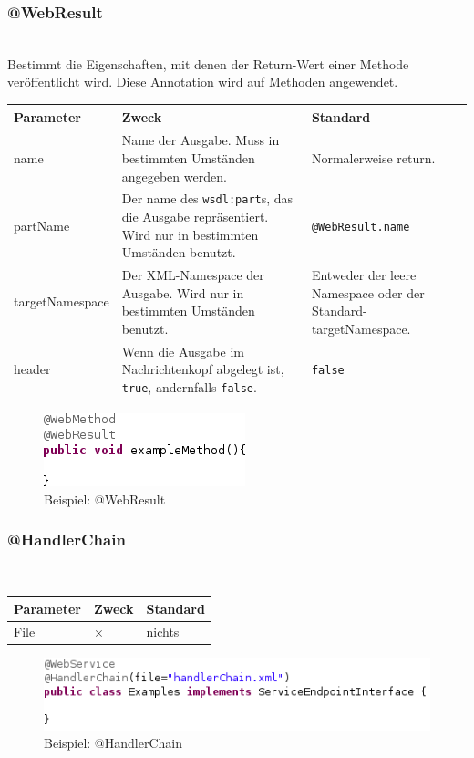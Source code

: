 \documentclass[runningheads]{llncs}
\newcommand{\germanquote}[1]{\glqq{}#1\grqq{}}
\newcommand{\anntabwidth}{\textwidth}
\begin{document}
    \subsubsection{@WebResult}\ \\
      Bestimmt die Eigenschaften, mit denen der Return-Wert einer Methode veröffentlicht wird. Diese Annotation wird auf Methoden angewendet.\\
    \begin{tabulary}{\anntabwidth}{|l|L|L|}
    \hline
    \textbf{Parameter} & \textbf{Zweck} & \textbf{Standard} \\
    \hline
      name &
      Name der Ausgabe. Muss in bestimmten Umständen angegeben werden. &
      Normalerweise \germanquote{return}. \\
    \hline
      partName &
      Der name des \texttt{wsdl:part}s, das die Ausgabe repräsentiert. Wird nur in bestimmten Umständen benutzt. &
      \texttt{@WebResult.name} \\
    \hline
      targetNamespace &
      Der XML-Namespace der Ausgabe. Wird nur in bestimmten Umständen benutzt. &
      Entweder der leere Namespace oder der Standard-targetNamespace. \\
    \hline
      header &
      Wenn die Ausgabe im Nachrichtenkopf abgelegt ist, \texttt{true}, andernfalls \texttt{false}. &
      \texttt{false} \\
    \hline
    \end{tabulary} \vfill
    \begin{figure}[tbh]
      \centering
      \includegraphics{../images/AtWebResult.png}
      \caption{Beispiel: @WebResult}
      \label{fig:wr}
    \end{figure} \vfill

    \subsubsection{@HandlerChain}\ \\
    \begin{tabulary}{\anntabwidth}{|l|L|L|}
    \hline
    \textbf{Parameter} & \textbf{Zweck} & \textbf{Standard} \\
    \hline
      File &
      × &
      nichts \\
    \hline
    \end{tabulary} \vfill
    \begin{figure}[tbh]
      \centering
      \includegraphics[width=\textwidth]{../images/AtHandlerChain.png}
      \caption{Beispiel: @HandlerChain}
      \label{fig:hc}
    \end{figure} \vfill
\end{document}
